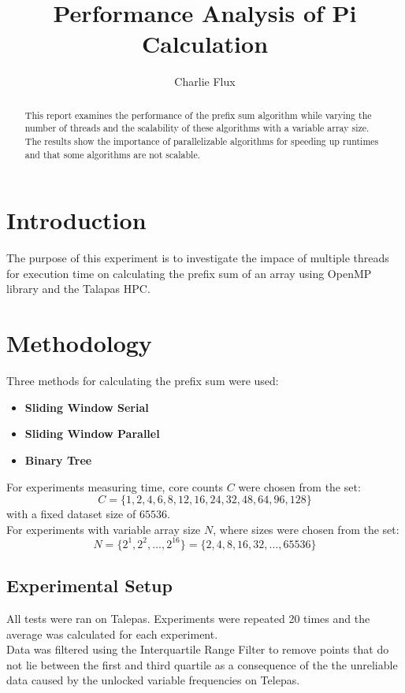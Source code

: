 \documentclass[conference]{IEEEtran}
\title{Performance Analysis of Pi Calculation}
\author{Charlie Flux}
\begin{document}
\maketitle

\begin{abstract}
This report examines the performance of the prefix sum algorithm while varying the number of threads and the scalability of these algorithms with a variable array size.
The results show the importance of parallelizable algorithms for speeding up runtimes and that some algorithms are not scalable.
\end{abstract}

\section{Introduction}
The purpose of this experiment is to investigate the impace of multiple threads for execution time on calculating the prefix sum of an array using OpenMP library and the Talapas HPC. 
\section{Methodology}
Three methods for calculating the prefix sum were used:
\begin{itemize}
    \item \textbf{Sliding Window Serial}
    \item \textbf{Sliding Window Parallel} 
    \item \textbf{Binary Tree}
\end{itemize}

For experiments measuring time, core counts \(C\) were chosen from the set:
    \[
    C = \{1, 2, 4, 6, 8, 12, 16, 24, 32, 48, 64, 96, 128\}
    \]
with a fixed dataset size of $65536$. \\
For experiments with variable array size \(N\), where sizes were chosen from the set:
    \[
    N = \{2^1, 2^2, \dots, 2^{16}\} = \{2, 4, 8, 16, 32, \dots, 65536\}
    \]

\subsection{Experimental Setup}
All tests were ran on Talepas. Experiments were repeated 20 times and the average was calculated for each experiment. \\
Data was filtered using the Interquartile Range Filter to remove points that do not lie between the first and third quartile as a consequence of the the unreliable data caused by the unlocked variable frequencies on Telepas.
\end{document}
